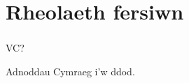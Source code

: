 \documentclass{beamer}
\begin{document}
\begin{frame}
  \begin{center}
    \vspace{0.8cm}
    
  \end{center}
\end{frame}

\section[]{Rheolaeth fersiwn}
\begin{frame}
\frametitle{\hfill}
\end{frame}

\begin{frame}
VC?
\end{frame}

\begin{frame}
Adnoddau Cymraeg i'w ddod.
\end{frame}
\end{document}
